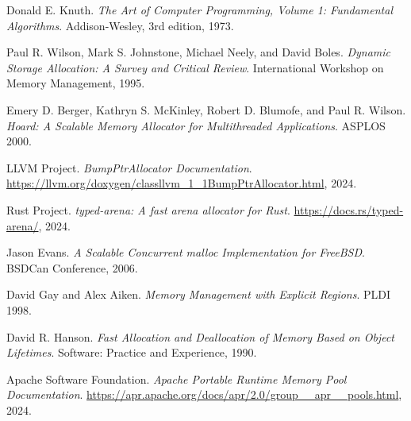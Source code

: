\documentclass[11pt,a4paper]{article}
\begin{document}
\begin{thebibliography}{9}

Donald E. Knuth.
\textit{The Art of Computer Programming, Volume 1: Fundamental Algorithms}.
Addison-Wesley, 3rd edition, 1973.

Paul R. Wilson, Mark S. Johnstone, Michael Neely, and David Boles.
\textit{Dynamic Storage Allocation: A Survey and Critical Review}.
International Workshop on Memory Management, 1995.

Emery D. Berger, Kathryn S. McKinley, Robert D. Blumofe, and Paul R. Wilson.
\textit{Hoard: A Scalable Memory Allocator for Multithreaded Applications}.
ASPLOS 2000.

LLVM Project.
\textit{BumpPtrAllocator Documentation}.
\url{https://llvm.org/doxygen/classllvm_1_1BumpPtrAllocator.html}, 2024.

Rust Project.
\textit{typed-arena: A fast arena allocator for Rust}.
\url{https://docs.rs/typed-arena/}, 2024.

Jason Evans.
\textit{A Scalable Concurrent malloc Implementation for FreeBSD}.
BSDCan Conference, 2006.

David Gay and Alex Aiken.
\textit{Memory Management with Explicit Regions}.
PLDI 1998.

David R. Hanson.
\textit{Fast Allocation and Deallocation of Memory Based on Object Lifetimes}.
Software: Practice and Experience, 1990.

Apache Software Foundation.
\textit{Apache Portable Runtime Memory Pool Documentation}.
\url{https://apr.apache.org/docs/apr/2.0/group__apr__pools.html}, 2024.

\end{thebibliography}
\end{document}

